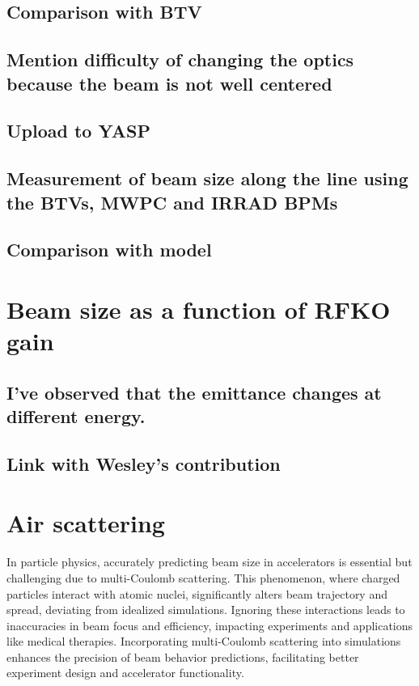 \documentclass[a4paper,
               ]{jacow}
\begin{document}
\subsection{Comparison with BTV}
\subsection{Mention difficulty of changing the optics because the beam is not well centered}
\subsection{Upload to YASP}
\subsection{Measurement of beam size along the line using the BTVs, MWPC and IRRAD BPMs}
\subsection{Comparison with model}

\section{Beam size as a function of RFKO gain}
\subsection{I've observed that the emittance changes at different energy.}
\subsection{Link with Wesley's contribution}

\section{Air scattering}

In particle physics, accurately predicting beam size in accelerators is essential but challenging due to multi-Coulomb scattering. This phenomenon, where charged particles interact with atomic nuclei, significantly alters beam trajectory and spread, deviating from idealized simulations. Ignoring these interactions leads to inaccuracies in beam focus and efficiency, impacting experiments and applications like medical therapies. Incorporating multi-Coulomb scattering into simulations enhances the precision of beam behavior predictions, facilitating better experiment design and accelerator functionality.
\end{document}
